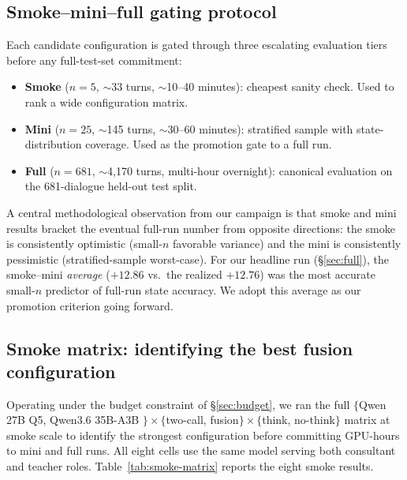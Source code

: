 \documentclass[11pt]{article}
\begin{document}
\subsection{Smoke--mini--full gating protocol}
\label{sec:protocol}

Each candidate configuration is gated through three escalating evaluation tiers before any full-test-set commitment:

\begin{itemize}
    \item \textbf{Smoke} ($n{=}5$, $\sim$33 turns, $\sim$10--40 minutes): cheapest sanity check. Used to rank a wide configuration matrix.
    \item \textbf{Mini} ($n{=}25$, $\sim$145 turns, $\sim$30--60 minutes): stratified sample with state-distribution coverage. Used as the promotion gate to a full run.
    \item \textbf{Full} ($n{=}681$, $\sim$4{,}170 turns, multi-hour overnight): canonical evaluation on the 681-dialogue held-out test split.
\end{itemize}

\noindent A central methodological observation from our campaign is that smoke and mini results bracket the eventual full-run number from opposite directions: the smoke is consistently optimistic (small-$n$ favorable variance) and the mini is consistently pessimistic (stratified-sample worst-case). For our headline run (\S\ref{sec:full}), the smoke--mini \emph{average} ($+12.86$ vs.\ the realized $+12.76$) was the most accurate small-$n$ predictor of full-run state accuracy. We adopt this average as our promotion criterion going forward.

\subsection{Smoke matrix: identifying the best fusion configuration}
\label{sec:smoke}

Operating under the budget constraint of \S\ref{sec:budget}, we ran the full $\{$Qwen 27B Q5, Qwen3.6 35B-A3B \citep{qwen2025qwen3}$\} \times \{$two-call, fusion$\} \times \{$think, no-think$\}$ matrix at smoke scale to identify the strongest configuration before committing GPU-hours to mini and full runs. All eight cells use the same model serving both consultant and teacher roles. Table~\ref{tab:smoke-matrix} reports the eight smoke results.
\end{document}
